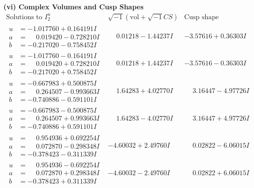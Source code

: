 \documentclass[1p]{elsarticle_modified}
\theoremstyle{definition}
\newcommand{\I}{\sqrt{-1}}
\begin{document}
\newpage\flushleft \textbf{(vi) Complex Volumes and Cusp Shapes}
$$\begin{array}{c|c|c}  
\text{Solutions to }I^u_{2}& \I (\text{vol} + \sqrt{-1}CS) & \text{Cusp shape}\\
 \hline 
\begin{aligned}
u &= -1.017760 + 0.164191 I \\
a &= \phantom{-}0.019420 - 0.728210 I \\
b &= -0.217020 - 0.758452 I\end{aligned}
 & \phantom{-}0.01218 - 1.44237 I & -3.57616 + 0.36303 I \\ \hline\begin{aligned}
u &= -1.017760 - 0.164191 I \\
a &= \phantom{-}0.019420 + 0.728210 I \\
b &= -0.217020 + 0.758452 I\end{aligned}
 & \phantom{-}0.01218 + 1.44237 I & -3.57616 - 0.36303 I \\ \hline\begin{aligned}
u &= -0.667983 + 0.500875 I \\
a &= \phantom{-}0.264507 - 0.993663 I \\
b &= -0.740886 - 0.591101 I\end{aligned}
 & \phantom{-}1.64283 + 4.02770 I & \phantom{-}3.16447 - 4.97726 I \\ \hline\begin{aligned}
u &= -0.667983 - 0.500875 I \\
a &= \phantom{-}0.264507 + 0.993663 I \\
b &= -0.740886 + 0.591101 I\end{aligned}
 & \phantom{-}1.64283 - 4.02770 I & \phantom{-}3.16447 + 4.97726 I \\ \hline\begin{aligned}
u &= \phantom{-}0.954936 + 0.692254 I \\
a &= \phantom{-}0.072870 - 0.298348 I \\
b &= -0.378423 - 0.311339 I\end{aligned}
 & -4.60032 + 2.49760 I & \phantom{-}0.02822 - 6.06015 I \\ \hline\begin{aligned}
u &= \phantom{-}0.954936 - 0.692254 I \\
a &= \phantom{-}0.072870 + 0.298348 I \\
b &= -0.378423 + 0.311339 I\end{aligned}
 & -4.60032 - 2.49760 I & \phantom{-}0.02822 + 6.06015 I \\ \hline\begin{aligned}

\end{aligned}
\end{array}$$
\end{document}
